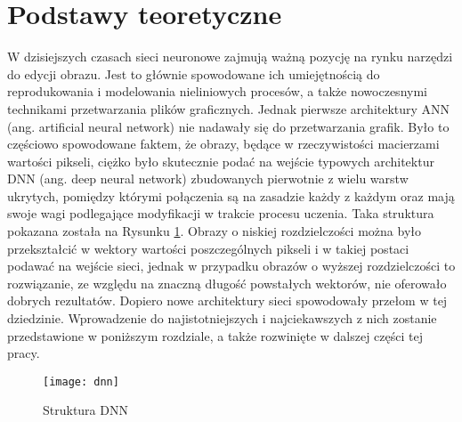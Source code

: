 \section[Podstawy teoretyczne (Piotr Winkler)]{Podstawy teoretyczne}

  W dzisiejszych czasach sieci neuronowe zajmują ważną pozycję na rynku narzędzi
  do edycji obrazu. Jest to głównie spowodowane ich umiejętnością do
  reprodukowania i modelowania nieliniowych procesów, a także nowoczesnymi
  technikami przetwarzania plików graficznych.
  Jednak pierwsze architektury ANN (ang. artificial neural network) nie nadawały
  się do przetwarzania grafik.
  Było to częściowo spowodowane faktem, że obrazy, będące w rzeczywistości macierzami
  wartości pikseli,
  ciężko było skutecznie podać
  na wejście typowych architektur DNN (ang. deep neural network) zbudowanych
  pierwotnie z wielu warstw ukrytych, pomiędzy którymi połączenia są na zasadzie
  każdy z każdym oraz mają swoje wagi podlegające modyfikacji w trakcie procesu
  uczenia. Taka struktura pokazana została na Rysunku \ref{fig:dnn}.
  Obrazy o niskiej rozdzielczości można było przekształcić w wektory
  wartości poszczególnych pikseli i w takiej postaci podawać na wejście sieci,
  jednak w przypadku obrazów o wyższej rozdzielczości to rozwiązanie, ze
  względu na znaczną długość powstałych wektorów, nie oferowało dobrych
  rezultatów.
  Dopiero nowe architektury sieci spowodowały przełom w tej dziedzinie.
  Wprowadzenie do najistotniejszych i najciekawszych z nich zostanie przedstawione w
  poniższym rozdziale, a także rozwinięte w dalszej części tej pracy.


  \begin{figure}[h]
    \centering
    \texttt{[image: dnn]}
    \caption[Struktura DNN - źródło: \url{https://towardsdatascience.com/building-a-convolutional-neural-network-male-vs-female-50347e2fa88b}]{Struktura DNN}
    \label{fig:dnn}
  \end{figure}


